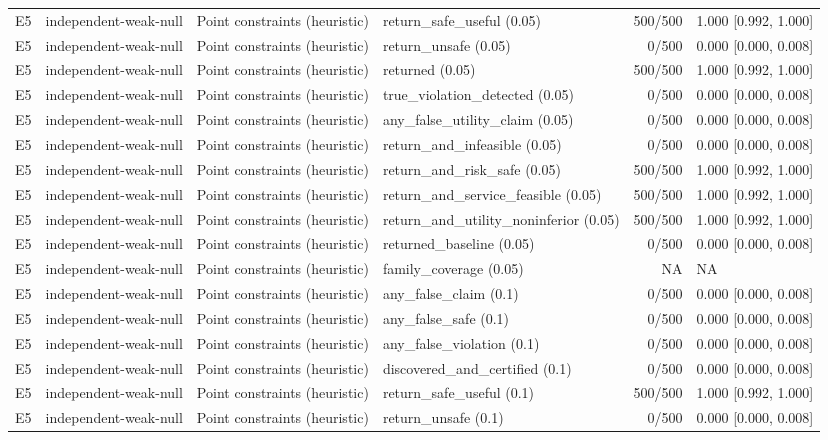 \begin{longtable}{p{.04\linewidth}p{.18\linewidth}p{.19\linewidth}p{.16\linewidth}r p{.21\linewidth}}
E5 & independent-weak-null & Point constraints (heuristic) & return\_safe\_useful (0.05) & 500/500 & 1.000 [0.992, 1.000]\\
E5 & independent-weak-null & Point constraints (heuristic) & return\_unsafe (0.05) & 0/500 & 0.000 [0.000, 0.008]\\
E5 & independent-weak-null & Point constraints (heuristic) & returned (0.05) & 500/500 & 1.000 [0.992, 1.000]\\
E5 & independent-weak-null & Point constraints (heuristic) & true\_violation\_detected (0.05) & 0/500 & 0.000 [0.000, 0.008]\\
E5 & independent-weak-null & Point constraints (heuristic) & any\_false\_utility\_claim (0.05) & 0/500 & 0.000 [0.000, 0.008]\\
E5 & independent-weak-null & Point constraints (heuristic) & return\_and\_infeasible (0.05) & 0/500 & 0.000 [0.000, 0.008]\\
E5 & independent-weak-null & Point constraints (heuristic) & return\_and\_risk\_safe (0.05) & 500/500 & 1.000 [0.992, 1.000]\\
E5 & independent-weak-null & Point constraints (heuristic) & return\_and\_service\_feasible (0.05) & 500/500 & 1.000 [0.992, 1.000]\\
E5 & independent-weak-null & Point constraints (heuristic) & return\_and\_utility\_noninferior (0.05) & 500/500 & 1.000 [0.992, 1.000]\\
E5 & independent-weak-null & Point constraints (heuristic) & returned\_baseline (0.05) & 0/500 & 0.000 [0.000, 0.008]\\
E5 & independent-weak-null & Point constraints (heuristic) & family\_coverage (0.05) & NA & NA\\
E5 & independent-weak-null & Point constraints (heuristic) & any\_false\_claim (0.1) & 0/500 & 0.000 [0.000, 0.008]\\
E5 & independent-weak-null & Point constraints (heuristic) & any\_false\_safe (0.1) & 0/500 & 0.000 [0.000, 0.008]\\
E5 & independent-weak-null & Point constraints (heuristic) & any\_false\_violation (0.1) & 0/500 & 0.000 [0.000, 0.008]\\
E5 & independent-weak-null & Point constraints (heuristic) & discovered\_and\_certified (0.1) & 0/500 & 0.000 [0.000, 0.008]\\
E5 & independent-weak-null & Point constraints (heuristic) & return\_safe\_useful (0.1) & 500/500 & 1.000 [0.992, 1.000]\\
E5 & independent-weak-null & Point constraints (heuristic) & return\_unsafe (0.1) & 0/500 & 0.000 [0.000, 0.008]\\

\end{longtable}
